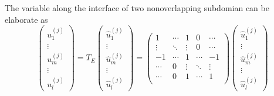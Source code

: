 The variable along the interface of two nonoverlapping subdomian can be elaborate as
\begin{equation}
\begin{pmatrix}
u_{1}^{(j)} \\ \vdots \\ u_{m}^{(j)} \\ \vdots \\ u_{l}^{(j)}
\end{pmatrix} = T_{E} \begin{pmatrix}
\hat{u}_{1}^{(j)} \\ \vdots \\ \hat{u}_{m}^{(j)} \\ \vdots \\ \hat{u}_{l}^{(j)}
\end{pmatrix} = \begin{pmatrix}
1 & \cdots & 1 & 0 & \cdots \\
\vdots & \ddots & \vdots & 0 & \cdots \\
-1 & \cdots & 1 & \cdots & -1 \\
\cdots & 0 & \vdots & \ddots &  \vdots \\
\cdots & 0 & 1 & \cdots & 1\\
\end{pmatrix} \begin{pmatrix}
\hat{u}_{1}^{(j)} \\ \vdots \\ \hat{u}_{m}^{(j)} \\ \vdots \\ \hat{u}_{l}^{(j)}
\end{pmatrix}
\end{equation}


